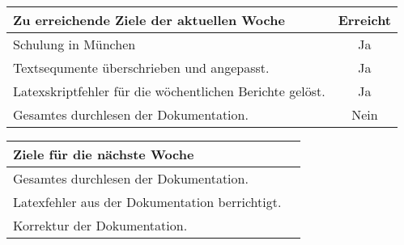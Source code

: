 \begin{tabularx}{\textwidth}{Xc}
    \arrayrulecolor{OliveGreen}
    \toprule
    {\bfseries Zu erreichende Ziele der aktuellen Woche} & {\bfseries Erreicht} \\
    \midrule[2pt]
    Schulung in München                                     &Ja              \\
    \rowcolor{OliveGreen!15}
    Textsequmente überschrieben und angepasst.               &Ja              \\
    \rowcolor{White}
    Latexskriptfehler für die wöchentlichen Berichte gelöst. &Ja              \\
    \rowcolor{OliveGreen!15}
    Gesamtes durchlesen der Dokumentation.                 &Nein              \\
  \bottomrule[2pt]
\end{tabularx}
%
\vspace{1cm}
%
\begin{tabularx}{\textwidth}{Xc}
    \arrayrulecolor{OliveGreen}
    \toprule
    {\bfseries Ziele für die nächste Woche}        &                         \\
    \midrule[2pt]
    Gesamtes durchlesen der Dokumentation.          &                         \\
    \rowcolor{OliveGreen!15}
    Latexfehler aus der Dokumentation berrichtigt.   &                         \\
    \rowcolor{White}
    Korrektur der Dokumentation.                    &                         \\
\end{tabularx}

